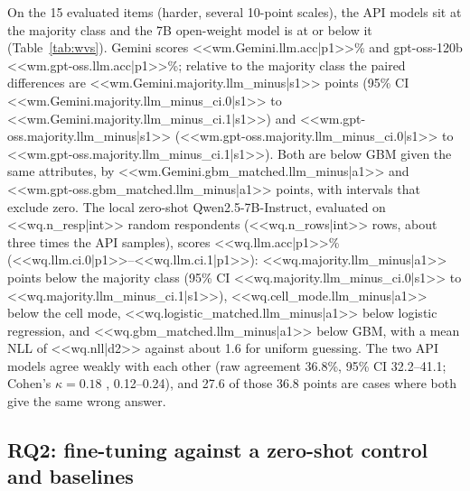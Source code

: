 \documentclass[conference]{IEEEtran}
\begin{document}
On the 15 evaluated items (harder, several 10-point scales), the API models sit at the majority class and the 7B open-weight model is at or below it (Table~\ref{tab:wvs}). Gemini scores <<wm.Gemini.llm.acc|p1>>\% and gpt-oss-120b <<wm.gpt-oss.llm.acc|p1>>\%; relative to the majority class the paired differences are <<wm.Gemini.majority.llm_minus|s1>> points (95\% CI <<wm.Gemini.majority.llm_minus_ci.0|s1>> to <<wm.Gemini.majority.llm_minus_ci.1|s1>>) and <<wm.gpt-oss.majority.llm_minus|s1>> (<<wm.gpt-oss.majority.llm_minus_ci.0|s1>> to <<wm.gpt-oss.majority.llm_minus_ci.1|s1>>). Both are below GBM given the same attributes, by <<wm.Gemini.gbm_matched.llm_minus|a1>> and <<wm.gpt-oss.gbm_matched.llm_minus|a1>> points, with intervals that exclude zero. The local zero-shot Qwen2.5-7B-Instruct, evaluated on <<wq.n_resp|int>> random respondents (<<wq.n_rows|int>> rows, about three times the API samples), scores <<wq.llm.acc|p1>>\% (<<wq.llm.ci.0|p1>>--<<wq.llm.ci.1|p1>>): <<wq.majority.llm_minus|a1>> points below the majority class (95\% CI <<wq.majority.llm_minus_ci.0|s1>> to <<wq.majority.llm_minus_ci.1|s1>>), <<wq.cell_mode.llm_minus|a1>> below the cell mode, <<wq.logistic_matched.llm_minus|a1>> below logistic regression, and <<wq.gbm_matched.llm_minus|a1>> below GBM, with a mean NLL of <<wq.nll|d2>> against about 1.6 for uniform guessing. The two API models agree weakly with each other (raw agreement 36.8\%, 95\% CI 32.2--41.1; Cohen's $\kappa=0.18$ \cite{cohen1960}, 0.12--0.24), and 27.6 of those 36.8 points are cases where both give the same wrong answer.

\subsection{RQ2: fine-tuning against a zero-shot control and baselines}

\begin{table}[!t]
\caption{Pew fold-0 results on 46{,}209 held-out answers from 6{,}000 respondents. $^\dagger$MAE on ordinal items. $^\S$Mean absolute error of the predicted subgroup-mean answer on a $[0,1]$ scale (hard predictions; lower is better).}
\label{tab:pewoverall}
\centering
\footnotesize

\end{table}

\begin{table}[!t]
\caption{Pew zero-shot control: methods scored on identical rows (<<zs.chat.n_resp|int>> respondents, <<zs.chat.n_rows|int>> rows). FT is the fine-tuned model (hard predictions from the lab run); NLL is available for probability-producing methods.}
\label{tab:pewzs}
\centering
\scriptsize

\end{table}
\end{document}
